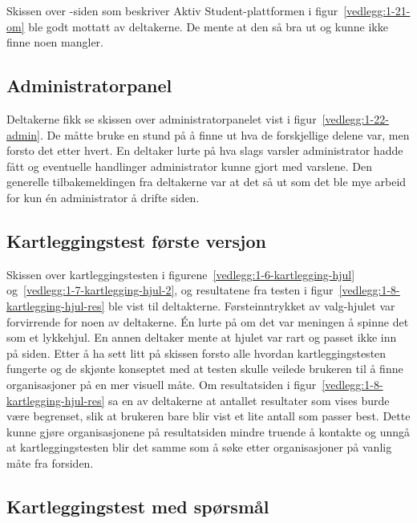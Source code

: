 Skissen over -siden som beskriver Aktiv Student-plattformen i figur~\ref{vedlegg:1-21-om} ble godt mottatt av deltakerne. De mente at den så bra ut og kunne ikke finne noen mangler.

\subsection{Administratorpanel}

Deltakerne fikk se skissen over administratorpanelet vist i figur~\ref{vedlegg:1-22-admin}. De måtte bruke en stund på å finne ut hva de forskjellige delene var, men forsto det etter hvert. En deltaker lurte på hva slags varsler administrator hadde fått og eventuelle handlinger administrator kunne gjort med varslene. Den generelle tilbakemeldingen fra deltakerne var at det så ut som det ble mye arbeid for kun én administrator å drifte siden.


\subsection{Kartleggingstest første versjon}

Skissen over kartleggingstesten i figurene~\ref{vedlegg:1-6-kartlegging-hjul} og~\ref{vedlegg:1-7-kartlegging-hjul-2}, og resultatene fra testen i figur~\ref{vedlegg:1-8-kartlegging-hjul-res} ble vist til deltakterne. Førsteinntrykket av valg-hjulet var forvirrende for noen av deltakerne. Én lurte på om det var meningen å spinne det som et lykkehjul. En annen deltaker mente at hjulet var rart og passet ikke inn på siden. Etter å ha sett litt på skissen forsto alle hvordan kartleggingstesten fungerte og de skjønte konseptet med at testen skulle veilede brukeren til å finne organisasjoner på en mer visuell måte. Om resultatsiden i figur~\ref{vedlegg:1-8-kartlegging-hjul-res} sa en av deltakerne at antallet resultater som vises burde være begrenset, slik at brukeren bare blir vist et lite antall som passer best. Dette kunne gjøre organisasjonene på resultatsiden mindre truende å kontakte og unngå at kartleggingstesten blir det samme som å søke etter organisasjoner på vanlig måte fra forsiden.


\subsection{Kartleggingstest med spørsmål}


